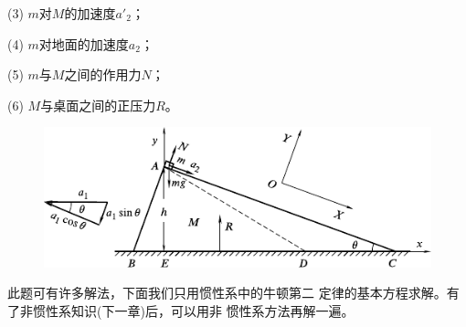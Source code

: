 (3) $ m $对$ M $的加速度$ a'_2 $；

(4) $ m $对地面的加速度$ a_2$；

\clearpage
(5) $ m $与$ M $之间的作用力$ N $；

(6) $ M $与桌面之间的正压力$ R $。
\begin{figure}[h]
  \centering
  \includegraphics{figure/fig03.16}
  \caption{}
  \label{fig:03.16}
\end{figure}

\solution 此题可有许多解法，下面我们只用惯性系中的牛顿第二
定律的基本方程求解。有了非惯性系知识(下一章)后，可以用非
惯性系方法再解一遍。

